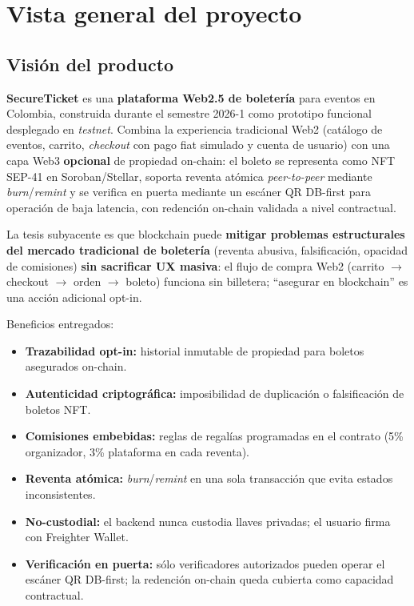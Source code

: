 \documentclass[12pt,oneside]{report}
\newcommand{\projectname}{SecureTicket}
\begin{document}

  \setcounter{section}{5}

  \section{Vista general del proyecto}
  \label{sec:vista-general}

    \subsection{Visión del producto}
    \label{subsec:vision}
    \textbf{\projectname} es una \textbf{plataforma Web2.5 de boletería} para eventos en Colombia, construida durante el semestre 2026-1 como prototipo funcional desplegado en \textit{testnet}. Combina la experiencia tradicional Web2 (catálogo de eventos, carrito, \textit{checkout} con pago fiat simulado y cuenta de usuario) con una capa Web3 \textbf{opcional} de propiedad on-chain: el boleto se representa como NFT SEP-41 en Soroban/Stellar, soporta reventa atómica \textit{peer-to-peer} mediante \textit{burn}/\textit{remint} y se verifica en puerta mediante un escáner QR DB-first para operación de baja latencia, con redención on-chain validada a nivel contractual.

    La tesis subyacente es que blockchain puede \textbf{mitigar problemas estructurales del mercado tradicional de boletería} (reventa abusiva, falsificación, opacidad de comisiones) \textbf{sin sacrificar UX masiva}: el flujo de compra Web2 (carrito $\rightarrow$ checkout $\rightarrow$ orden $\rightarrow$ boleto) funciona sin billetera; ``asegurar en blockchain'' es una acción adicional opt-in.

    Beneficios entregados:
    \begin{itemize}
      \item \textbf{Trazabilidad opt-in:} historial inmutable de propiedad para boletos asegurados on-chain.
      \item \textbf{Autenticidad criptográfica:} imposibilidad de duplicación o falsificación de boletos NFT.
      \item \textbf{Comisiones embebidas:} reglas de regalías programadas en el contrato (5\% organizador, 3\% plataforma en cada reventa).
      \item \textbf{Reventa atómica:} \textit{burn}/\textit{remint} en una sola transacción que evita estados inconsistentes.
      \item \textbf{No-custodial:} el backend nunca custodia llaves privadas; el usuario firma con Freighter Wallet.
      \item \textbf{Verificación en puerta:} sólo verificadores autorizados pueden operar el escáner QR DB-first; la redención on-chain queda cubierta como capacidad contractual.
    \end{itemize}
\end{document}
